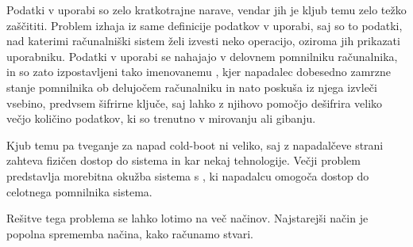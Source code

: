 \documentclass[12pt,a4paper,openany]{book}
\begin{document}
Podatki v uporabi so zelo kratkotrajne narave, vendar jih je kljub temu zelo težko zaščititi. Problem izhaja iz same definicije podatkov v uporabi, saj so to podatki, nad katerimi računalniški sistem želi izvesti neko operacijo, oziroma jih prikazati uporabniku. Podatki v uporabi se nahajajo v delovnem pomnilniku računalnika, in so zato izpostavljeni tako imenovanemu , kjer napadalec dobesedno zamrzne stanje pomnilnika ob delujočem računalniku in nato poskuša iz njega izvleči vsebino, predvsem šifrirne ključe, saj lahko z njihovo pomočjo dešifrira veliko večjo količino podatkov, ki so trenutno v mirovanju ali gibanju.

Kjub temu pa tveganje za napad cold-boot ni veliko, saj z napadalčeve strani zahteva fizičen dostop do sistema in kar nekaj tehnologije. Večji problem predstavlja morebitna okužba sistema s , ki napadalcu omogoča dostop do celotnega pomnilnika sistema.

Rešitve tega problema se lahko lotimo na več načinov. Najstarejši način je popolna sprememba načina, kako računamo stvari.




\newpage


\listoffigures

\newpage

\listoftables




\newpage
\nocite{*}

\label{literatura}

\end{document}

